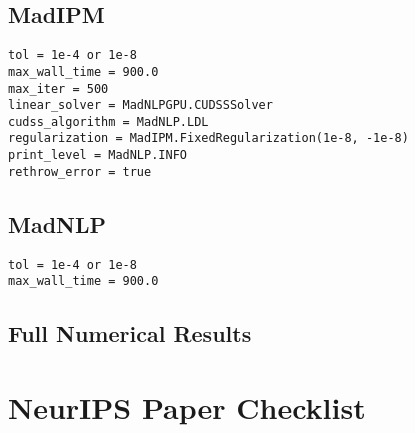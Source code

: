 \documentclass{article}
\begin{document}
\subsection{MadIPM} 
\begin{verbatim}
tol = 1e-4 or 1e-8
max_wall_time = 900.0
max_iter = 500
linear_solver = MadNLPGPU.CUDSSSolver
cudss_algorithm = MadNLP.LDL
regularization = MadIPM.FixedRegularization(1e-8, -1e-8)
print_level = MadNLP.INFO
rethrow_error = true
\end{verbatim}
\subsection{MadNLP}
\begin{verbatim}
tol = 1e-4 or 1e-8
max_wall_time = 900.0
\end{verbatim}
\subsection{Full Numerical Results}







\newpage
\section*{NeurIPS Paper Checklist}


\end{document}
